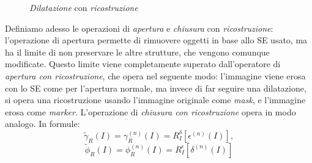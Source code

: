 \begin{figure}[H]
{{{			}
		}
	}
	\caption[\textit{Dilatazione} con \textit{ricostruzione}]{\textit{Dilatazione} con \textit{ricostruzione}\protect\footnotemark} \label{fig:dilation-reconstruction}
\end{figure}
Definiamo adesso le operazioni di \textit{apertura} e \textit{chiusura} con \textit{ricostruzione}: l'operazione di apertura permette di rimuovere oggetti in base allo SE usato, ma ha il limite di non preservare le altre strutture, che vengono comunque modificate. Questo limite viene completamente superato dall'operatore di \textit{apertura con ricostruzione}, che opera nel seguente modo: l'immagine viene erosa con lo SE come per l'apertura normale, ma invece di far seguire una dilatazione, si opera una ricostruzione usando l'immagine originale come \textit{mask}, e l'immagine erosa come \textit{marker}. L'operazione di \textit{chiusura con ricostruzione} opera in modo analogo. In formule:
\begin{equation}
	\label{eq:opening-reconstruction}
	\tilde{\gamma}_{R}(I) = \gamma_{R}^{(n)}(I) = R_{I}^{\delta}[\epsilon^{(n)}(I)],
\end{equation}
\begin{equation}
	\label{eq:closing-reconstruction}
	\tilde{\phi}_{R}(I) = \phi_{R}^{(n)}(I) = R_{I}^{\epsilon}[\delta^{(n)}(I)]
\end{equation}\par
